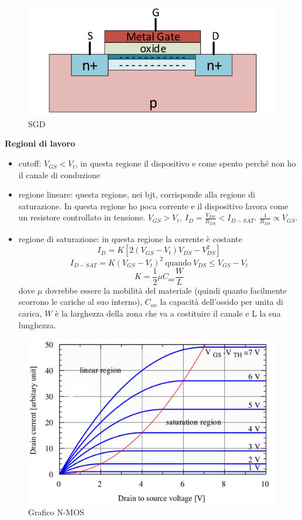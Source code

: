 \documentclass[
]{book}
\providecommand{\tightlist}{%
  \setlength{\itemsep}{0pt}\setlength{\parskip}{0pt}}
\begin{document}
\begin{figure}
\centering
\includegraphics[width=0.5\linewidth,height=\textheight,keepaspectratio]{immagini/15.png}
\caption{SGD}
\end{figure}

\textbf{Regioni di lavoro}

\begin{itemize}
\tightlist
\item
  cutoff: \(V_{GS}<V_{t}\), in questa regione il dispositivo e come
  spento perché non ho il canale di conduzione
\item
  regione lineare: questa regione, nei bjt, corrisponde alla regione di
  saturazione. In questa regione ho poca corrente e il dispositivo
  lavora come un resistore controllato in tensione. \(V_{GS}>V_{t},\
  I_{D}=\frac{V_{DS}}{R_{DS}}<I_{D-SAT}\).
  \(\frac{1}{R_{DS}}\propto V_{GS}\).
\item
  regione di saturazione: in questa regione la corrente è costante
  \[I_{D}
  = K[2(V_{GS}-V_{t})V_{DS}-V_{DS}^{2}]\]
  \[I_{D-SAT} = K(V_{GS}-V_{t})^{2}\ \text{quando}\
  V_{DS}\leq V_{GS}-V_{t}\] \[K = \frac{1}{2}\mu C_{ox}\frac{W}{L}\]
  dove \(\mu\) dovrebbe essere la mobilità del materiale (quindi quanto
  facilmente scorrono le cariche al suo interno), \(C_{ox}\) la capacità
  dell'ossido per unita di carica, \(W\) è la larghezza della zona che
  va a costituire il canale e L la sua lunghezza.
\end{itemize}

\begin{figure}
\centering
\includegraphics[width=0.5\linewidth,height=\textheight,keepaspectratio]{immagini/16.png}
\caption{Grafico N-MOS}
\end{figure}
\end{document}
